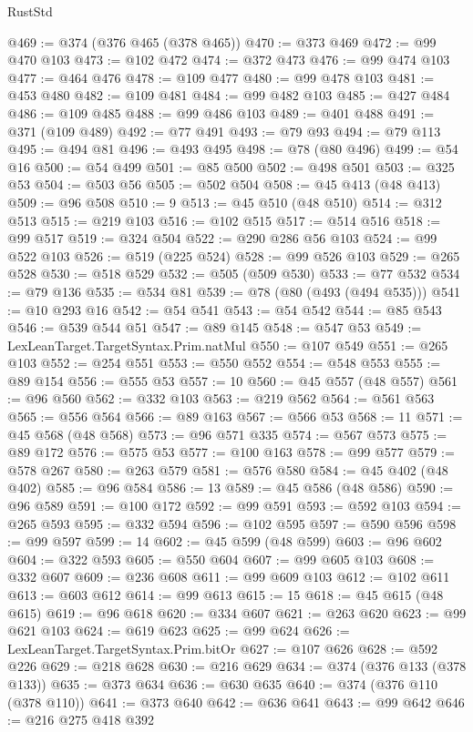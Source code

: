 \begin{lexlean}{RustStd}
\begin{coremodule}
@469 := @374 (@376 @465 (@378 @465))
@470 := @373 @469
@472 := @99 @470 @103
@473 := @102 @472
@474 := @372 @473
@476 := @99 @474 @103
@477 := @464 @476
@478 := @109 @477
@480 := @99 @478 @103
@481 := @453 @480
@482 := @109 @481
@484 := @99 @482 @103
@485 := @427 @484
@486 := @109 @485
@488 := @99 @486 @103
@489 := @401 @488
@491 := @371 (@109 @489)
@492 := @77 @491
@493 := @79 @93
@494 := @79 @113
@495 := @494 @81
@496 := @493 @495
@498 := @78 (@80 @496)
@499 := @54 @16
@500 := @54 @499
@501 := @85 @500
@502 := @498 @501
@503 := @325 @53
@504 := @503 @56
@505 := @502 @504
@508 := @45 @413 (@48 @413)
@509 := @96 @508
@510 := 9
@513 := @45 @510 (@48 @510)
@514 := @312 @513
@515 := @219 @103
@516 := @102 @515
@517 := @514 @516
@518 := @99 @517
@519 := @324 @504
@522 := @290 @286 @56 @103
@524 := @99 @522 @103
@526 := @519 (@225 @524)
@528 := @99 @526 @103
@529 := @265 @528
@530 := @518 @529
@532 := @505 (@509 @530)
@533 := @77 @532
@534 := @79 @136
@535 := @534 @81
@539 := @78 (@80 (@493 (@494 @535)))
@541 := @10 @293 @16
@542 := @54 @541
@543 := @54 @542
@544 := @85 @543
@546 := @539 @544 @51
@547 := @89 @145
@548 := @547 @53
@549 := LexLeanTarget.TargetSyntax.Prim.natMul
@550 := @107 @549
@551 := @265 @103
@552 := @254 @551
@553 := @550 @552
@554 := @548 @553
@555 := @89 @154
@556 := @555 @53
@557 := 10
@560 := @45 @557 (@48 @557)
@561 := @96 @560
@562 := @332 @103
@563 := @219 @562
@564 := @561 @563
@565 := @556 @564
@566 := @89 @163
@567 := @566 @53
@568 := 11
@571 := @45 @568 (@48 @568)
@573 := @96 @571 @335
@574 := @567 @573
@575 := @89 @172
@576 := @575 @53
@577 := @100 @163
@578 := @99 @577
@579 := @578 @267
@580 := @263 @579
@581 := @576 @580
@584 := @45 @402 (@48 @402)
@585 := @96 @584
@586 := 13
@589 := @45 @586 (@48 @586)
@590 := @96 @589
@591 := @100 @172
@592 := @99 @591
@593 := @592 @103
@594 := @265 @593
@595 := @332 @594
@596 := @102 @595
@597 := @590 @596
@598 := @99 @597
@599 := 14
@602 := @45 @599 (@48 @599)
@603 := @96 @602
@604 := @322 @593
@605 := @550 @604
@607 := @99 @605 @103
@608 := @332 @607
@609 := @236 @608
@611 := @99 @609 @103
@612 := @102 @611
@613 := @603 @612
@614 := @99 @613
@615 := 15
@618 := @45 @615 (@48 @615)
@619 := @96 @618
@620 := @334 @607
@621 := @263 @620
@623 := @99 @621 @103
@624 := @619 @623
@625 := @99 @624
@626 := LexLeanTarget.TargetSyntax.Prim.bitOr
@627 := @107 @626
@628 := @592 @226
@629 := @218 @628
@630 := @216 @629
@634 := @374 (@376 @133 (@378 @133))
@635 := @373 @634
@636 := @630 @635
@640 := @374 (@376 @110 (@378 @110))
@641 := @373 @640
@642 := @636 @641
@643 := @99 @642
@646 := @216 @275 @418 @392

\end{coremodule}
\end{lexlean}
